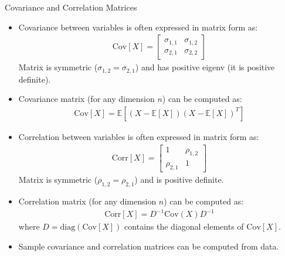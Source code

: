 \documentclass[handout,9pt]{beamer}
\begin{document}
%
\begin{frame}{Covariance and Correlation Matrices}

\begin{itemize}
\item Covariance between variables is often expressed in matrix form as: 
\begin{align*}
\textrm{Cov}[X]=\left[\begin{array}{cc}\sigma_{1,1}&\sigma_{1,2}\\ \sigma_{2,1}&\sigma_{2,2}\end{array}\right]
\end{align*}
Matrix is symmetric ($\sigma_{1,2}=\sigma_{2,1}$) and has positive eigenv (it is positive definite).  

\item Covariance matrix (for any dimension $n$) can be computed as:
\begin{align*}
\textrm{Cov}[X]=\mathbb{E}\left[(X-\mathbb{E}[X])(X-\mathbb{E}[X])^T\right]
\end{align*}

\item Correlation between variables is often expressed in matrix form as: 
\begin{align*}
\textrm{Corr}[X]=\left[\begin{array}{cc}1&\rho_{1,2}\\ \rho_{2,1}&1\end{array}\right]
\end{align*}
Matrix is symmetric ($\rho_{1,2}=\rho_{2,1}$) and is positive definite.  

\item Correlation matrix (for any dimension $n$) can be computed as:
\begin{align*}
\textrm{Corr}[X]=D^{-1}\textrm{Cov}(X) D^{-1}
\end{align*}
where $D=\textrm{diag}(\textrm{Cov}[X])$ contains the diagonal elements of $\textrm{Cov}[X]$. 
\item Sample covariance and correlation matrices can be computed from data. 
\end{itemize}


\end{frame}
\end{document}
